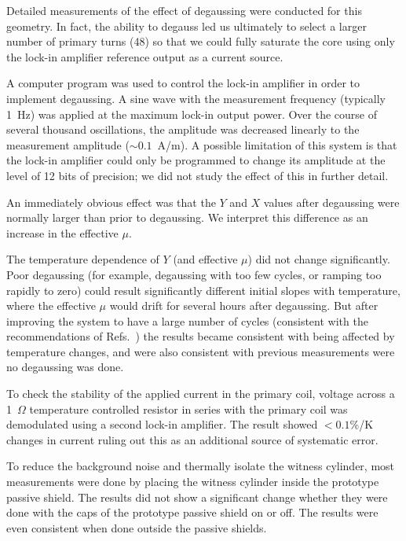Detailed measurements of the effect of degaussing were conducted for
this geometry.  In fact, the ability to degauss led us ultimately to
select a larger number of primary turns (48) so that we could fully
saturate the core using only the lock-in amplifier reference output as
a current source.

A computer program was used to control the lock-in amplifier in order
to implement degaussing.  A sine wave with the measurement frequency
(typically 1~Hz) was applied at the maximum lock-in output power.
Over the course of several thousand oscillations, the amplitude was
decreased linearly to the measurement amplitude ($\sim 0.1$~A/m).  A
possible limitation of this system is that the lock-in amplifier could
only be programmed to change its amplitude at the level of 12 bits of
precision; we did not study the effect of this in further detail.

An immediately obvious effect was that the $Y$ and $X$ values after
degaussing were normally larger than prior to degaussing.  We
interpret this difference as an increase in the effective $\mu$.

The temperature dependence of $Y$ (and effective $\mu$) did not change
significantly.  Poor degaussing (for example, degaussing with too few
cycles, or ramping too rapidly to zero) could result significantly
different initial slopes with temperature, where the effective $\mu$
would drift for several hours after degaussing.  But after improving
the system to have a large number of cycles (consistent with the
recommendations of Refs.~\cite{bib:thiel}) the results became
consistent with being affected by temperature changes, and were also
consistent with previous measurements were no degaussing was done.

To check the stability of the applied current in the primary coil,
voltage across a 1~$\Omega$ temperature controlled resistor in series
with the primary coil was demodulated using a second lock-in
amplifier.  The result showed $<0.1$\%/K changes in current ruling out
this as an additional source of systematic error.

To reduce the background noise and thermally isolate the witness
cylinder, most measurements were done by placing the witness cylinder
inside the prototype passive shield.  The results did not show a
significant change whether they were done with the caps of the
prototype passive shield on or off.  The results were even consistent
when done outside the passive shields.




